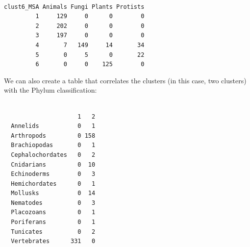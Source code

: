 \documentclass[
  letterpaper,
  DIV=11,
  numbers=noendperiod]{scrreprt}
\newenvironment{Shaded}{}{}
\newcommand{\DecValTok}[1]{\textcolor[rgb]{0.82,0.60,0.40}{#1}}
\newcommand{\FunctionTok}[1]{\textcolor[rgb]{0.38,0.69,0.94}{#1}}
\newcommand{\NormalTok}[1]{\textcolor[rgb]{0.67,0.70,0.75}{#1}}
\newcommand{\OtherTok}[1]{\textcolor[rgb]{0.15,0.68,0.38}{#1}}
\newcommand{\SpecialCharTok}[1]{\textcolor[rgb]{0.34,0.71,0.76}{#1}}
\newcommand{\StringTok}[1]{\textcolor[rgb]{0.60,0.76,0.47}{#1}}
\begin{document}
\begin{Shaded}
\end{Shaded}

\begin{verbatim}
          
clust6_MSA Animals Fungi Plants Protists
         1     129     0      0        0
         2     202     0      0        0
         3     197     0      0        0
         4       7   149     14       34
         5       0     5      0       22
         6       0     0    125        0
\end{verbatim}

We can also create a table that correlates the clusters (in this case,
two clusters) with the Phylum classification:

\begin{Shaded}
\end{Shaded}

\begin{verbatim}
                  
                     1   2
  Annelids           0   1
  Arthropods         0 158
  Brachiopodas       0   1
  Cephalochordates   0   2
  Cnidarians         0  10
  Echinoderms        0   3
  Hemichordates      0   1
  Mollusks           0  14
  Nematodes          0   3
  Placozoans         0   1
  Poriferans         0   1
  Tunicates          0   2
  Vertebrates      331   0
\end{verbatim}
\end{document}
